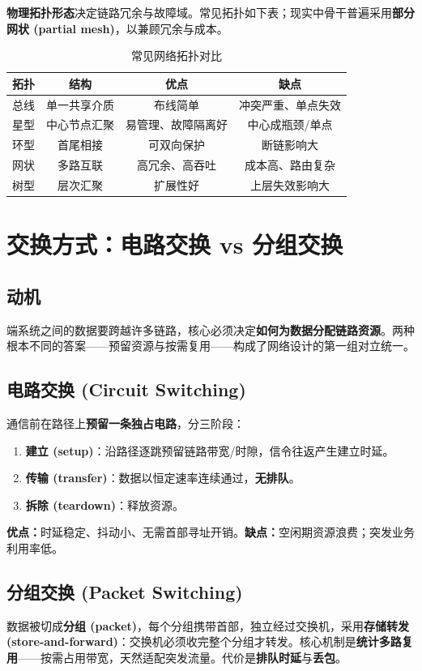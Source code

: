 \textbf{物理拓扑形态}决定链路冗余与故障域。常见拓扑如下表；现实中骨干普遍采用\textbf{部分网状 (partial mesh)}，以兼顾冗余与成本。

\begin{table}[H]
\centering
\caption{常见网络拓扑对比}
\begin{tabulary}{\textwidth}{CCCC}
\toprule
拓扑 & 结构 & 优点 & 缺点 \\
\midrule
总线 & 单一共享介质 & 布线简单 & 冲突严重、单点失效 \\
星型 & 中心节点汇聚 & 易管理、故障隔离好 & 中心成瓶颈/单点 \\
环型 & 首尾相接 & 可双向保护 & 断链影响大 \\
网状 & 多路互联 & 高冗余、高吞吐 & 成本高、路由复杂 \\
树型 & 层次汇聚 & 扩展性好 & 上层失效影响大 \\
\bottomrule
\end{tabulary}
\end{table}

\section{交换方式：电路交换 vs 分组交换}

\subsection{动机}
端系统之间的数据要跨越许多链路，核心必须决定\textbf{如何为数据分配链路资源}。两种根本不同的答案——预留资源与按需复用——构成了网络设计的第一组对立统一。

\subsection{电路交换 (Circuit Switching)}
通信前在路径上\textbf{预留一条独占电路}，分三阶段：

\begin{enumerate}
    \item \textbf{建立 (setup)}：沿路径逐跳预留链路带宽/时隙，信令往返产生建立时延。
    \item \textbf{传输 (transfer)}：数据以恒定速率连续通过，\textbf{无排队}。
    \item \textbf{拆除 (teardown)}：释放资源。
\end{enumerate}

\textbf{优点：}时延稳定、抖动小、无需首部寻址开销。\textbf{缺点：}空闲期资源浪费；突发业务利用率低。

\subsection{分组交换 (Packet Switching)}
数据被切成\textbf{分组 (packet)}，每个分组携带首部，独立经过交换机，采用\textbf{存储转发 (store-and-forward)}：交换机必须收完整个分组才转发。核心机制是\textbf{统计多路复用}——按需占用带宽，天然适配突发流量。代价是\textbf{排队时延}与\textbf{丢包}。

